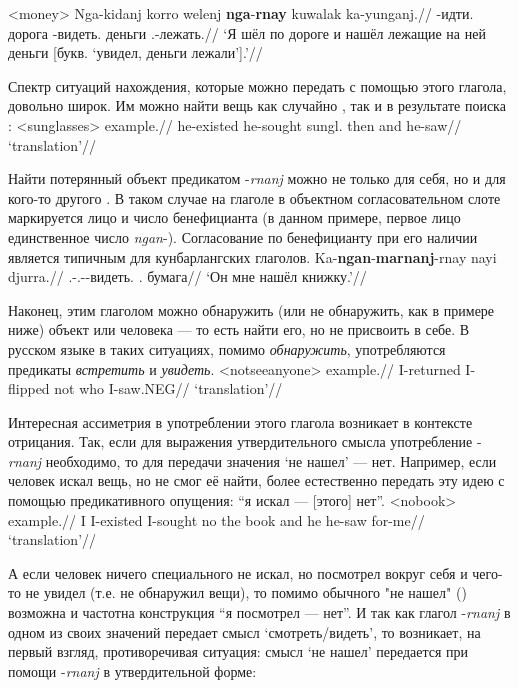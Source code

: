 \ex<money>\begingl
\gla Nga-kidanj korro welenj \textbf{nga}-\textbf{rnay} kuwalak ka-yunganj.//
\glb \nga-идти.\Pst{} \korro{} дорога \nga-видеть.\Pst{} деньги \Tsg.\Real-лежать.\Pst{}//
\glft `Я шёл по дороге и нашёл лежащие на ней деньги [букв. `увидел, деньги лежали'].'//%
\endgl\xe

Спектр ситуаций нахождения, которые можно передать с помощью этого глагола, довольно широк. Им можно найти вещь как случайно , так и в результате поиска :
\ex<sunglasses>\begingl
\gla example.//
\glb he-existed he-sought sungl. then and he-saw//
\glft `translation'//
\endgl\xe

Найти потерянный объект предикатом -\textit{rnanj} можно не только для себя, но и для кого-то другого . В таком случае на глаголе в объектном согласовательном слоте маркируется лицо и число бенефицианта (в данном примере, первое лицо единственное число \textit{ngan}-). Согласование по бенефицианту при его наличии является типичным для кунбарлангских глаголов. 
\begingl
\gla Ka-\textbf{ngan}-\textbf{marnanj}-rnay nayi djurra.//
\glb \Tsg.\Real-\Fsg.\Obj-\Ben-видеть.\Pst{} \Nm.\Cli{} бумага//
\glft `Он мне нашёл книжку.'//%
\endgl\xe

Наконец, этим глаголом можно обнаружить (или не обнаружить, как в примере ниже) объект или человека --- то есть найти его, но не присвоить в себе. В русском языке в таких ситуациях, помимо \textit{обнаружить}, употребляются предикаты \textit{встретить} и \textit{увидеть}.
\ex<notseeanyone>\begingl
\gla example.//
\glb  I-returned I-flipped not who I-saw.NEG//
\glft `translation'//
\endgl\xe

Интересная ассиметрия в употреблении этого глагола возникает в контексте отрицания. Так, если для выражения утвердительного смысла употребление -\textit{rnanj} необходимо, то для передачи значения `не нашел' --- нет. Например, если человек искал вещь, но не смог её найти, более естественно передать эту идею с помощью предикативного опущения: ``я искал --- [этого] нет''.
\ex<nobook>\begingl
\gla example.//
\glb I I-existed I-sought no the book and he he-saw for-me//
\glft `translation'//
\endgl\xe

А если человек ничего специального не искал, но посмотрел вокруг себя и чего-то не увидел (т.е. не обнаружил вещи), то помимо обычного "не нашел" () возможна и частотна конструкция ``я посмотрел --- нет''. И так как глагол -\textit{rnanj} в одном из своих значений передает смысл `смотреть/видеть', то возникает, на первый взгляд, противоречивая ситуация: смысл `не нашел' передается при помощи -\textit{rnanj} в утвердительной форме:


